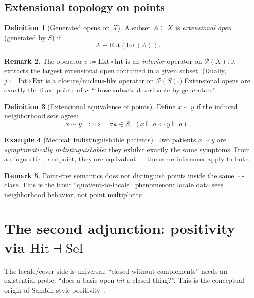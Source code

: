 \documentclass[11pt]{article}
\theoremstyle{definition}
\newtheorem{definition}{Definition}[section]
\newtheorem{remark}[definition]{Remark}
\newtheorem{example}[definition]{Example}
\theoremstyle{plain}
\newcommand{\Pow}{\mathcal P}
\newcommand{\Ext}{\mathrm{Ext}}
\newcommand{\Intt}{\mathrm{Int}}
\newcommand{\Hit}{\mathrm{Hit}}
\newcommand{\Sel}{\mathrm{Sel}}
\newcommand{\forces}{\Vdash}
\begin{document}
\subsection{Extensional topology on points}

\begin{definition}[Generated opens on $X$]
A subset $A\subseteq X$ is \emph{extensional open} (generated by $S$) if
\[
A=\Ext(\Intt(A)).
\]
\end{definition}

\begin{remark}
The operator $c:=\Ext\circ\Intt$ is an \emph{interior} operator on $\Pow(X)$: it extracts the largest extensional open contained in a given subset.
(Dually, $j:=\Intt\circ\Ext$ is a closure/nucleus-like operator on $\Pow(S)$.)
Extensional opens are exactly the fixed points of $c$: ``those subsets describable by generators''.
\end{remark}

\begin{definition}[Extensional equivalence of points]
Define $x\sim y$ if the induced neighborhood sets agree:
\[
x\sim y \quad:\Longleftrightarrow\quad \forall a\in S,\ (x\forces a \Leftrightarrow y\forces a).
\]
\end{definition}

\begin{example}[Medical: Indistinguishable patients]
Two patients $x \sim y$ are \emph{symptomatically indistinguishable}: they exhibit exactly the same symptoms.
From a diagnostic standpoint, they are equivalent --- the same inferences apply to both.
\end{example}

\begin{remark}
Point-free semantics does not distinguish points inside the same $\sim$-class.
This is the basic ``quotient-to-locale'' phenomenon: locale data sees neighborhood behavior, not point multiplicity.
\end{remark}

\section{The second adjunction: positivity via $\Hit \dashv \Sel$}\label{sec:adj2}

The locale/cover side is universal; ``closed without complements'' needs an existential probe:
``does a basic open \emph{hit} a closed thing?''.
This is the conceptual origin of Sambin-style positivity~\cite{Sambin-OUP-PositiveTopology,Valentini2012,CirauloVickers2016}.
\end{document}
